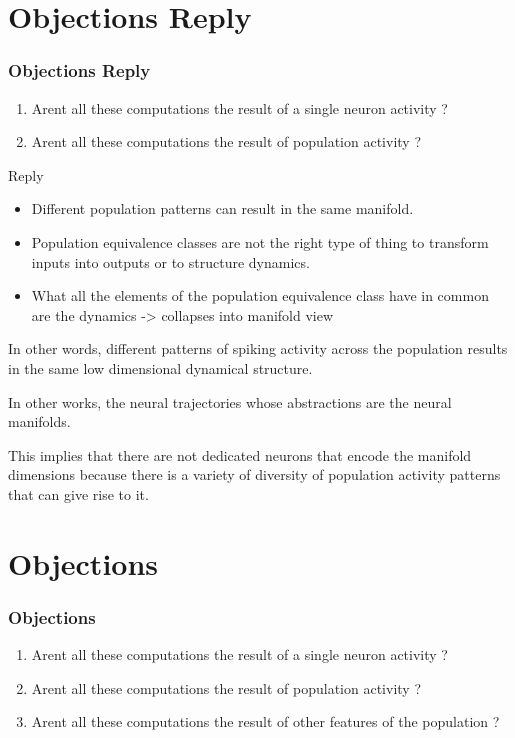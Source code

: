 \documentclass{beamer}
\begin{document}
\section{Objections Reply}
\begin{frame}
\frametitle{\textbf{Objections Reply} }

\begin{enumerate}
    \item Arent all these computations the result of a single neuron activity ?
    \item Arent all these computations the result of population activity ?
\end{enumerate}

Reply

\begin{itemize}
    \item Different population patterns can result in the same manifold.
    \item Population equivalence classes are not the right type of thing to transform inputs into outputs or to structure dynamics.
    \item What all the elements of the population equivalence class have in common are the dynamics -> collapses into manifold view
\end{itemize}


In other words, different patterns of spiking activity across the population results in the same low dimensional dynamical structure.


In other works, the neural trajectories whose abstractions are the neural manifolds.

This implies that there are not dedicated neurons that encode the manifold dimensions because there is a variety of diversity of population activity patterns that can give rise to it.

\end{frame}


\section{Objections}
\begin{frame}
\frametitle{\textbf{Objections} }

\begin{enumerate}
    \item Arent all these computations the result of a single neuron activity ?
    \item Arent all these computations the result of population activity ?
    \item Arent all these computations the result of other features of the population ?
\end{enumerate}


\end{frame}
\end{document}
